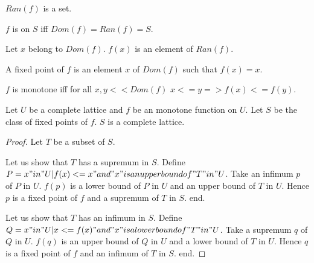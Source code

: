 \documentclass{document}
\begin{document}
\begin{forthel}
    \begin{signature}[RanSort]
      $Ran(f)$ is a set.
    \end{signature}

    \begin{definition}[DefDom]
      $f$ is on $S$ iff $Dom(f) = Ran(f) = S$.
    \end{definition}

    \begin{axiom}[ImgSort]
      Let $x$ belong to $Dom(f)$. $f(x)$ is an element of $Ran(f)$.
    \end{axiom}

    \begin{definition}[DefFix]
      A fixed point of $f$ is an element $x$ of $Dom(f)$ such that $f(x) = x$.
    \end{definition}

    \begin{definition}[DefMonot]
      $f$ is monotone iff for all $x,y << Dom(f)$ $x <= y => f(x) <= f(y)$.
    \end{definition}


    \begin{theorem}[Tarski]
      Let $U$ be a complete lattice and $f$ be an monotone function on $U$. Let $S$ be the class of fixed points of $f$. $S$ is a complete lattice.
    \end{theorem}
    \begin{proof}
      Let $T$ be a subset of $S$.

      Let us show that $T$ has a supremum in $S$.
        Define $P = {x "in" U | f(x) <= x "and" x "is an upper bound of" T "in" U}$. Take an infimum $p$ of $P$ in $U$. $f(p)$ is a lower bound of $P$ in $U$ and an upper bound of $T$ in $U$. Hence $p$ is a fixed point of $f$ and a supremum of $T$ in $S$.
      end.

      Let us show that $T$ has an infimum in $S$.
        Define $Q = {x "in" U | x <= f(x) "and" x "is a lower bound of" T "in" U}$. Take a supremum $q$ of $Q$ in $U$. $f(q)$ is an upper bound of $Q$ in $U$ and a lower bound of $T$ in $U$. Hence $q$ is a fixed point of $f$ and an infimum of $T$ in $S$.
      end.
    \end{proof}
  \end{forthel}
\end{document}
